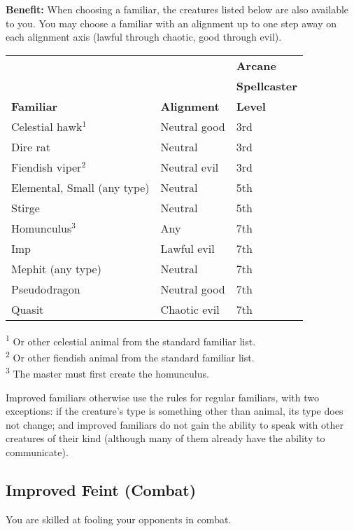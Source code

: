 \textbf{Benefit:} When choosing a familiar, the creatures listed below are also available to you. You may choose a familiar with an alignment up to one step away on each alignment axis (lawful through chaotic, good through evil).
\begin{table}
\sffamily
\begin{tabular}{lll}
                  &                    & \textbf{Arcane} \\
                  &                    & \textbf{Spellcaster} \\
\textbf{Familiar} & \textbf{Alignment} & \textbf{Level}\\

Celestial hawk\(^{1}\) & Neutral good & 3rd\\
Dire rat & Neutral & 3rd\\
Fiendish viper\(^{2}\) & Neutral evil & 3rd\\
Elemental, Small (any type) & Neutral & 5th\\
Stirge& Neutral & 5th\\
Homunculus\(^{3}\) & Any & 7th\\
Imp & Lawful evil & 7th\\
Mephit (any type) & Neutral & 7th\\
Pseudodragon & Neutral good & 7th\\
Quasit & Chaotic evil & 7th\\
\end{tabular}
\textsuperscript{1} Or other celestial animal from the standard familiar list. \\
\textsuperscript{2} Or other fiendish animal from the standard familiar list. \\
\textsuperscript{3} The master must first create the homunculus.

\end{table}

				
Improved familiars otherwise use the rules for regular familiars\textit{, }with two exceptions: if the creature's type is something other than animal, its type does not change; and improved familiars do not gain the ability to speak with other creatures of their kind (although many of them already have the ability to communicate).
				
\subsection{Improved Feint (Combat)}

				
You are skilled at fooling your opponents in combat.
				
